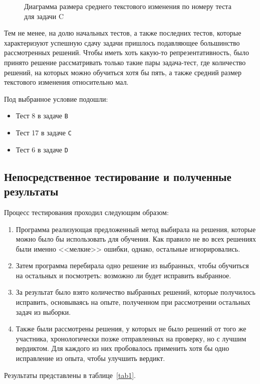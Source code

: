 \begin{figure}[!h] 
\caption{Диаграмма размера среднего текстового изменения по номеру теста для задачи C}\label{fig3} 
\centering
{}

\end{figure}

Тем не менее, на долю начальных тестов, а также последних тестов, которые характеризуют успешную сдачу задачи пришлось подавляющее
большинство рассмотренных решений. Чтобы иметь хоть какую-то репрезентативность, было принято решение рассматривать только такие пары
задача-тест, где количество решений, на которых можно обучиться хотя бы пять, а также средний размер текстового изменения относительно
мал.

Под выбранное условие подошли:
\begin{itemize}
    \item Тест 8 в задаче \texttt{B}
    \item Тест 17 в задаче \texttt{C}
    \item Тест 6 в задаче \texttt{D}
\end{itemize}

\subsection{Непосредственное тестирование и полученные результаты}

Процесс тестирования проходил следующим образом:
\begin{enumerate}
\item Программа реализующая предложенный метод выбирала на решения, которые можно было бы использовать для обучения.
    Как правило не во всех решениях были именно <<мелкие>> ошибки, однако, остальные игнорировались.
\item Затем программа перебирала одно решение из выбранных, чтобы обучиться на остальных и посмотреть: возможно ли будет
    исправить выбранное.
\item За результат было взято количество выбранных решений, которые получилось исправить, основываясь на опыте, полученном
    при рассмотрении остальных задач из выборки.
\item Также были рассмотрены решения, у которых не было решений от того же участника, хронологически
    позже отправленных на проверку, но с лучшим вердиктом. Для каждого из них пробовалось применить хотя бы одно исправление из опыта,
    чтобы улучшить вердикт.  
\end{enumerate}
Результаты представлены в таблице~\ref{tab1}.

